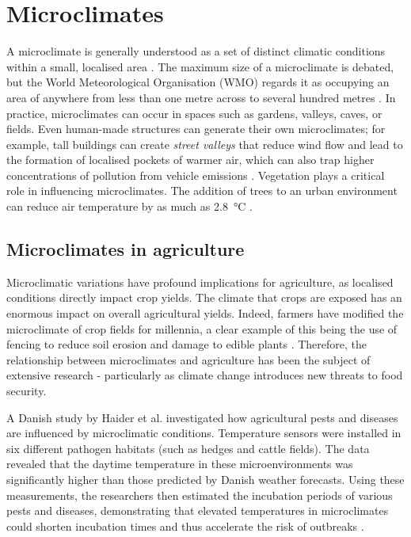 \section{Microclimates}

A microclimate is generally understood as a set of distinct climatic conditions
within a small, localised area \cite{MetOffice2023}. The maximum size of a
microclimate is debated, but the World Meteorological Organisation (WMO) regards
it as occupying an area of anywhere from less than one metre across to several
hundred metres \cite{wmo2024}.  In practice, microclimates can occur in spaces
such as gardens, valleys, caves, or fields. Even human-made structures can
generate their own microclimates; for example, tall buildings can create
\emph{street valleys} that reduce wind flow and lead to the formation of
localised pockets of warmer air, which can also trap higher concentrations of
pollution from vehicle emissions \cite{yang2023}. Vegetation plays a critical
role in influencing microclimates. The addition of trees to an urban environment
can reduce air temperature by as much as \SI{2.8}{\degreeCelsius}
\cite{lai2019}.

\subsection{Microclimates in agriculture}

Microclimatic variations have profound implications for agriculture, as
localised conditions directly impact crop yields. The climate that crops are
exposed has an enormous impact on overall agricultural yields. Indeed, farmers
have modified the microclimate of crop fields for millennia, a clear example of
this being the use of fencing to reduce soil erosion and damage to edible plants
\cite{cleugh1998}. Therefore, the relationship between microclimates and
agriculture has been the subject of extensive research - particularly as climate
change introduces new threats to food security.

A Danish study by Haider et al. investigated how agricultural pests and diseases
are influenced by microclimatic conditions. Temperature sensors were installed
in six different pathogen habitats (such as hedges and cattle fields). The data
revealed that the daytime temperature in these microenvironments was
significantly higher than those predicted by Danish weather forecasts. Using
these measurements, the researchers then estimated the incubation periods of
various pests and diseases, demonstrating that elevated temperatures in
microclimates could shorten incubation times and thus accelerate the risk of
outbreaks \cite{haider2017}.

